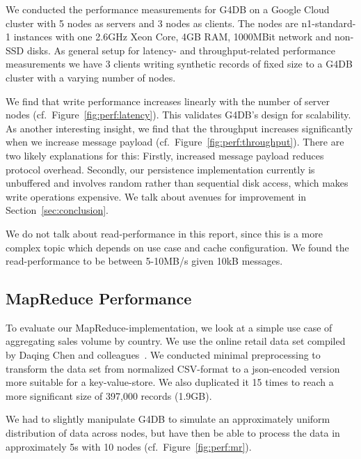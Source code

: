 We conducted the performance measurements for G4DB on a Google Cloud cluster with 5 nodes as servers and 3 nodes as clients.
The nodes are n1-standard-1 instances with one 2.6GHz Xeon Core, 4GB RAM, 1000MBit network and non-SSD disks.
As general setup for latency- and throughput-related performance measurements we have 3 clients writing synthetic
records of fixed size to a G4DB cluster with a varying number of nodes.

We find that write performance increases linearly with the number of server nodes (cf.~Figure~\ref{fig:perf:latency}).
This validates G4DB's design for scalability.
As another interesting insight, we find that the throughput increases significantly when we increase message payload (cf.~Figure~\ref{fig:perf:throughput}).
There are two likely explanations for this:
Firstly, increased message payload reduces protocol overhead.
Secondly, our persistence implementation currently is unbuffered and involves random rather than sequential disk access,
which makes write operations expensive. We talk about avenues for improvement in Section~\ref{sec:conclusion}.

We do not talk about read-performance in this report, since this is a more complex topic which depends on use case and cache configuration.
We found the read-performance to be between 5-10MB/s given 10kB messages.

\subsection{MapReduce Performance}


To evaluate our MapReduce-implementation, we look at a simple use case of aggregating sales volume by country. %
We use the online retail data set compiled by Daqing Chen and colleagues~\cite{Chen2012}.
We conducted minimal preprocessing to transform the data set from normalized CSV-format to a \ac{json}-encoded
version more suitable for a key-value-store.
We also duplicated it 15 times to reach a more significant size of 397,000 records (1.9GB).

We had to slightly manipulate G4DB to simulate an approximately uniform distribution of data across nodes,
but have then be able to process the data in approximately 5s with 10 nodes (cf.~Figure~\ref{fig:perf:mr}).


